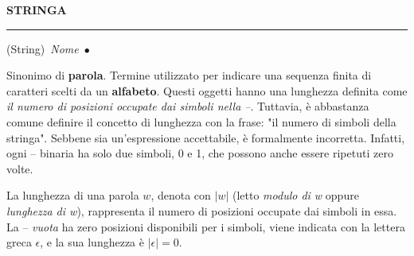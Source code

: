 \documentclass[10pt,a4paper,twoside]{article} %
\newcommand{\entry}[4]{\noindent\textbf{\MakeUppercase{#1}}\markboth{#1}{#1}\par
\vspace{0.5\baselineskip} %
\noindent\hrule\par
\vspace{0.5\baselineskip} %
{(#2)}\ \textit{#3}\ $\bullet$\
{#4}\\%
}
\begin{document}
\begin{multicols*}{2}
\entry{Stringa}{String}{Nome} {Sinonimo di \textbf{parola}. Termine utilizzato
per indicare una sequenza finita di caratteri scelti da un \textbf{alfabeto}.
Questi oggetti hanno una lunghezza definita come \textit{il numero di posizioni
occupate dai simboli nella --}. Tuttavia, è abbastanza comune definire il
concetto di lunghezza con la frase: "il numero di simboli della stringa".
Sebbene sia un'espressione accettabile, è formalmente incorretta. Infatti, ogni
-- binaria ha solo due simboli, 0 e 1, che possono anche essere ripetuti zero
volte.

La lunghezza di una parola $w$, denota con $\left\vert w\right\vert$ (letto
\textit{modulo di w} oppure \textit{lunghezza di w}), rappresenta il numero di
posizioni occupate dai simboli in essa. La -- \textit{vuota} ha zero posizioni
disponibili per i simboli, viene indicata con la lettera greca $\epsilon$, e 
la sua lunghezza è $\left\vert\epsilon\right\vert=0$. 
}
\end{multicols*}

\end{document}

